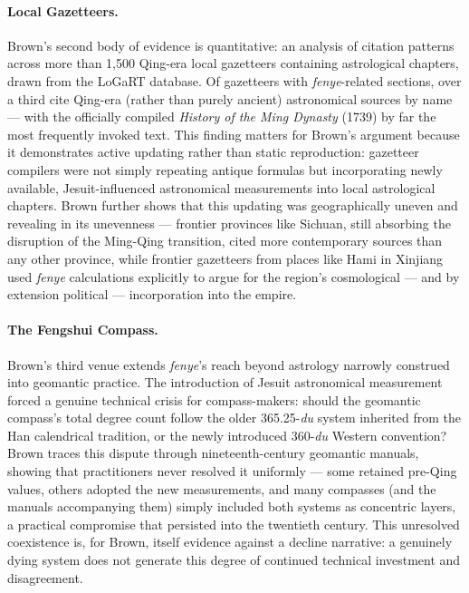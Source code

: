 \documentclass[10pt]{article}
\begin{document}
\paragraph{Local Gazetteers.} Brown's second body of evidence is quantitative: an analysis of citation patterns across more than 1,500 Qing-era local gazetteers containing astrological chapters, drawn from the LoGaRT database. Of gazetteers with \emph{fenye}-related sections, over a third cite Qing-era (rather than purely ancient) astronomical sources by name --- with the officially compiled \emph{History of the Ming Dynasty} (1739) by far the most frequently invoked text. This finding matters for Brown's argument because it demonstrates active updating rather than static reproduction: gazetteer compilers were not simply repeating antique formulas but incorporating newly available, Jesuit-influenced astronomical measurements into local astrological chapters. Brown further shows that this updating was geographically uneven and revealing in its unevenness --- frontier provinces like Sichuan, still absorbing the disruption of the Ming-Qing transition, cited more contemporary sources than any other province, while frontier gazetteers from places like Hami in Xinjiang used \emph{fenye} calculations explicitly to argue for the region's cosmological --- and by extension political --- incorporation into the empire.

\paragraph{The Fengshui Compass.} Brown's third venue extends \emph{fenye}'s reach beyond astrology narrowly construed into geomantic practice. The introduction of Jesuit astronomical measurement forced a genuine technical crisis for compass-makers: should the geomantic compass's total degree count follow the older 365.25-\emph{du} system inherited from the Han calendrical tradition, or the newly introduced 360-\emph{du} Western convention? Brown traces this dispute through nineteenth-century geomantic manuals, showing that practitioners never resolved it uniformly --- some retained pre-Qing values, others adopted the new measurements, and many compasses (and the manuals accompanying them) simply included both systems as concentric layers, a practical compromise that persisted into the twentieth century. This unresolved coexistence is, for Brown, itself evidence against a decline narrative: a genuinely dying system does not generate this degree of continued technical investment and disagreement.
\end{document}
